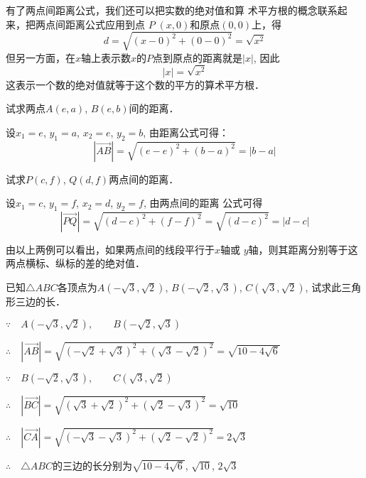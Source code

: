 有了两点间距离公式，我们还可以把实数的绝对值和算
术平方根的概念联系起来，把两点间距离公式应用到点
$P\; (x,0)$和原点$(0,0)$上，得
\[d=\sqrt{(x-0)^2+(0-0)^2}=\sqrt{x^2}\]
但另一方面，在$x$轴上表示数$x$的$P$点到原点的距离就是$|x|$, 
因此
\[|x|=\sqrt{x^2}\]
这表示一个数的绝对值就等于这个数的平方的算术平方根．

\begin{example}
    试求两点$A(e,a)$, $B(e,b)$间的距离．
\end{example}

\begin{solution}
    设$x_1=e$, $y_1=a$, $x_2=e$, $y_2=b$, 由距离公式可得：
\[|\Vec{AB}|=\sqrt{(e-e)^2+(b-a)^2}=|b-a|\]
\end{solution}

\begin{example}
    试求$P(c,f)$, $Q(d,f)$两点间的距离．
\end{example}


\begin{solution}
    设$x_1=c$, $y_1=f$, $x_2=d$, $y_2=f$, 由两点间的距离
公式可得
\[|\Vec{PQ}|=\sqrt{(d-c)^2+(f-f)^2}=\sqrt{(d-c)^2}=|d-c|\]
\end{solution}

由以上两例可以看出，如果两点间的线段平行于$x$轴或
$y$轴，则其距离分别等于这两点横标、纵标的差的绝对值．


\begin{example}
    已知$\triangle ABC$各顶点为$A(-\sqrt{3},\sqrt{2})$,
$B(-\sqrt{2},\sqrt{3})$, $C(\sqrt{3},\sqrt{2})$, 试求此三角形三边的长．
\end{example}

\begin{solution}
$\because\quad A(-\sqrt{3},\sqrt{2}),\qquad B(-\sqrt{2},\sqrt{3})$

$\therefore\quad |\Vec{AB}|=\sqrt{\left(-\sqrt{2}+\sqrt{3}\right)^2+\left(\sqrt{3}-\sqrt{2}\right)^2}=\sqrt{10-4\sqrt{6}}$

$\because\quad B(-\sqrt{2},\sqrt{3}),\qquad C(\sqrt{3},\sqrt{2})$

$\therefore\quad |\Vec{BC}|=\sqrt{\left(\sqrt{3}+\sqrt{2}\right)^2+\left(\sqrt{2}-\sqrt{3}\right)^2}=\sqrt{10}$

$\therefore\quad |\Vec{CA}|=\sqrt{\left(-\sqrt{3}-\sqrt{3}\right)^2+\left(\sqrt{2}-\sqrt{2}\right)^2}=2\sqrt{3}$

$\therefore\quad \triangle ABC$的三边的长分别为$\sqrt{10-4\sqrt{6}}$, $\sqrt{10}$, $2\sqrt{3}$
\end{solution}


